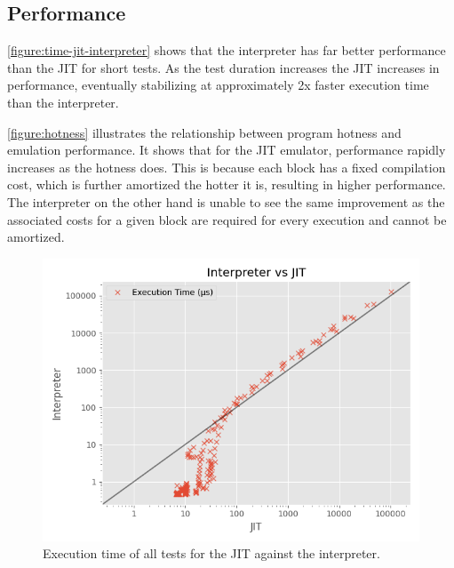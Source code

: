 \subsection{Performance}

\autoref{figure:time-jit-interpreter} shows that the interpreter has far better performance than the JIT for short tests. As the test duration increases the JIT increases in performance, eventually stabilizing at approximately 2x faster execution time than the interpreter.

\autoref{figure:hotness} illustrates the relationship between program hotness and emulation performance. It shows that for the JIT emulator, performance rapidly increases as the hotness does. This is because each block has a fixed compilation cost, which is further amortized the hotter it is, resulting in higher performance. The interpreter on the other hand is unable to see the same improvement as the associated costs for a given block are required for every execution and cannot be amortized.

\begin{figure}
    \centering
    \includegraphics{output/graphs/scatter/time.png}
    \caption{Execution time of all tests for the JIT against the interpreter.}
    \label{figure:time-jit-interpreter}
\end{figure}

